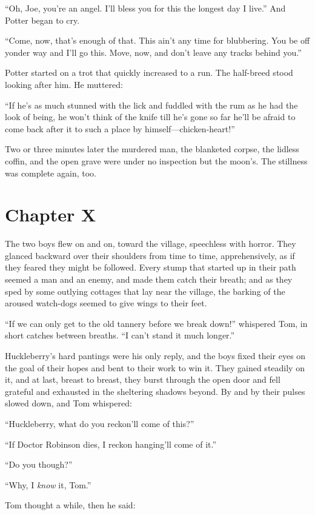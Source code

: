 \documentclass{book}
\begin{document}
“Oh, Joe, you’re an angel. I’ll bless you for this the longest day I live.” And Potter began to cry.

“Come, now, that’s enough of that. This ain’t any time for blubbering. You be off yonder way and I’ll go this. Move, now, and don’t leave any tracks behind you.”

Potter started on a trot that quickly increased to a run. The half-breed stood looking after him. He muttered:

“If he’s as much stunned with the lick and fuddled with the rum as he had the look of being, he won’t think of the knife till he’s gone so far he’ll be afraid to come back after it to such a place by himself—chicken-heart!”

Two or three minutes later the murdered man, the blanketed corpse, the lidless coffin, and the open grave were under no inspection but the moon’s. The stillness was complete again, too.

\chapter*{Chapter X}

The two boys flew on and on, toward the village, speechless with horror. They glanced backward over their shoulders from time to time, apprehensively, as if they feared they might be followed. Every stump that started up in their path seemed a man and an enemy, and made them catch their breath; and as they sped by some outlying cottages that lay near the village, the barking of the aroused watch-dogs seemed to give wings to their feet.

“If we can only get to the old tannery before we break down!” whispered Tom, in short catches between breaths. “I can’t stand it much longer.”

Huckleberry’s hard pantings were his only reply, and the boys fixed their eyes on the goal of their hopes and bent to their work to win it. They gained steadily on it, and at last, breast to breast, they burst through the open door and fell grateful and exhausted in the sheltering shadows beyond. By and by their pulses slowed down, and Tom whispered:

“Huckleberry, what do you reckon’ll come of this?”

“If Doctor Robinson dies, I reckon hanging’ll come of it.”

“Do you though?”

“Why, I \emph{know} it, Tom.”

Tom thought a while, then he said:
\end{document}
